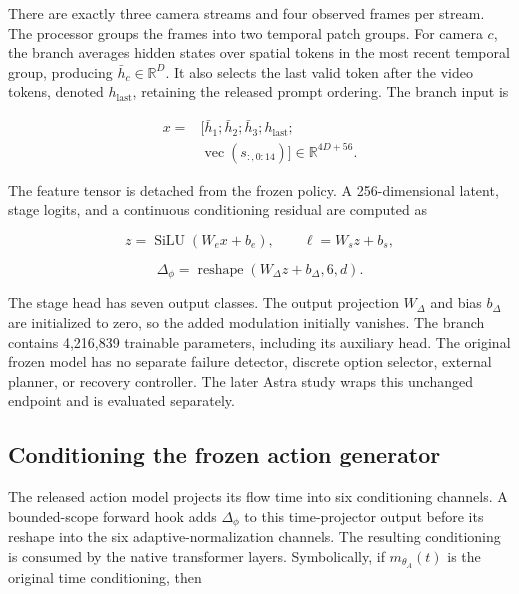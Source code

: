 \documentclass[10pt,twocolumn,letterpaper]{article}
\begin{document}
There are exactly three camera streams and four observed frames per stream. The processor groups the frames into two temporal patch groups. For camera $c$, the branch averages hidden states over spatial tokens in the most recent temporal group, producing $\bar h_c\in\mathbb{R}^{D}$. It also selects the last valid token after the video tokens, denoted $h_{\mathrm{last}}$, retaining the released prompt ordering. The branch input is


\begin{equation}\begin{aligned}x={}&[\bar h_1;\bar h_2;\bar h_3;h_{\mathrm{last}};\\&\operatorname{vec}(s_{:,0:14})]\in\mathbb{R}^{4D+56}.\end{aligned}\end{equation}

The feature tensor is detached from the frozen policy. A 256-dimensional latent, stage logits, and a continuous conditioning residual are computed as


\begin{equation}z=\operatorname{SiLU}(W_e x+b_e),\qquad \ell=W_s z+b_s,\end{equation}

\begin{equation}\Delta_\phi=\operatorname{reshape}(W_\Delta z+b_\Delta,6,d).\end{equation}

The stage head has seven output classes. The output projection $W_\Delta$ and bias $b_\Delta$ are initialized to zero, so the added modulation initially vanishes. The branch contains 4,216,839 trainable parameters, including its auxiliary head. The original frozen model has no separate failure detector, discrete option selector, external planner, or recovery controller. The later Astra study wraps this unchanged endpoint and is evaluated separately.


\subsection{Conditioning the frozen action generator}

The released action model projects its flow time into six conditioning channels. A bounded-scope forward hook adds $\Delta_\phi$ to this time-projector output before its reshape into the six adaptive-normalization channels. The resulting conditioning is consumed by the native transformer layers. Symbolically, if $m_{\theta_A}(t)$ is the original time conditioning, then
\end{document}
